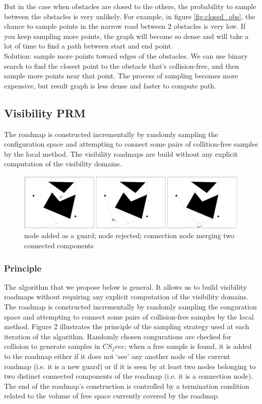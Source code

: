 \documentclass[11pt]{article}
\begin{document}
But in the case when obstacles are closed to the others, the probability to sample between the obstacles is very unlikely. For example, in figure \ref{fig:closed_obs}, the chance to sample points in the narrow road between 2 obstacles is very low. If you keep sampling more points, the graph will become so dense and will take a lot of time to find a path between start and end point.\\
Solution: sample more points toward edges of the obstacles. We can use binary search to find the closest point to the obstacle that's collision-free, and then sample more points near that point. The process of sampling becomes more expensive, but result graph is less dense and faster to compute path.

\subsection{Visibility PRM}
The roadmap is constructed incrementally by randomly sampling the configuration space and attempting to connect some pairs of collition-free samples by the local method.
The visibility roadmaps are build without any explicit computation of the visibility domains.
\begin{figure}[h]
\includegraphics{visibility_psm_visual}
\centering
\caption{node added as a guard; node rejected; connection node merging two connected components}
\label{fig:roadmap_alg}
\end{figure}

\subsubsection{Principle}
The algorithm that we propose below is general. It allows us to build visibility
roadmaps without requiring any explicit computation of the visibility domains.
The roadmap is constructed incrementally by randomly sampling the conguration
space and attempting to connect some pairs of collision-free samples by the
local method. Figure 2 illustrates the principle of the sampling strategy used at
each iteration of the algorithm. Randomly chosen congurations are checked for
collision to generate samples in $CS_free$; when a free sample is found, it is added to
the roadmap either if it does not ‘see’ any another node of the current roadmap (i.e.
it is a new guard) or if it is seen by at least two nodes belonging to two distinct
connected components of the roadmap (i.e. it is a connection node). The end of
the roadmap’s construction is controlled by a termination condition related to the
volume of free space currently covered by the roadmap.
\end{document}
